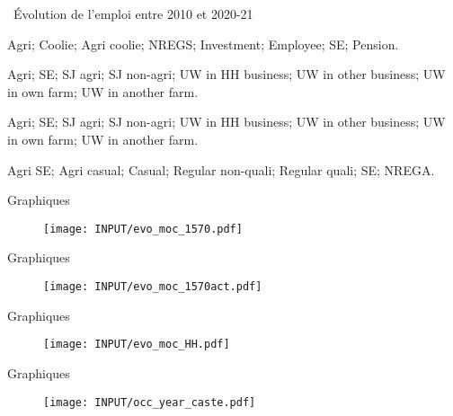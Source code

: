 \documentclass[aspectratio=169]{beamer}
\begin{document}
\begin{frame}{\faCommentsO ~Évolution de l'emploi entre 2010 et 2020-21}
    \begin{vfilleditems}
        \item[2010] Agri; Coolie; Agri coolie; NREGS; Investment; Employee; SE; Pension.
        \item[2016] Agri; SE; SJ agri; SJ non-agri; UW in HH business; UW in other business; UW in own farm; UW in another farm.
        \item[2020] Agri; SE; SJ agri; SJ non-agri; UW in HH business; UW in other business; UW in own farm; UW in another farm.
        \item[Panel] Agri SE; Agri casual; Casual; Regular non-quali; Regular quali; SE; NREGA.
    \end{vfilleditems}
\end{frame}



\begin{frame}[plain, shrink=2]{Graphiques}
\begin{figure}[htpb]
\centering
\texttt{[image: INPUT/evo\_moc\_1570.pdf]}
\end{figure}
\end{frame}



\begin{frame}[plain, shrink=2]{Graphiques}
\begin{figure}[htpb]
\centering
\texttt{[image: INPUT/evo\_moc\_1570act.pdf]}
\end{figure}
\end{frame}


\begin{frame}[plain, shrink=2]{Graphiques}
\begin{figure}[htpb]
\centering
\texttt{[image: INPUT/evo\_moc\_HH.pdf]}
\end{figure}
\end{frame}




\begin{frame}[plain, shrink=2]{Graphiques}
\begin{figure}[htpb]
\centering
\texttt{[image: INPUT/occ\_year\_caste.pdf]}
\end{figure}
\end{frame}
\end{document}
